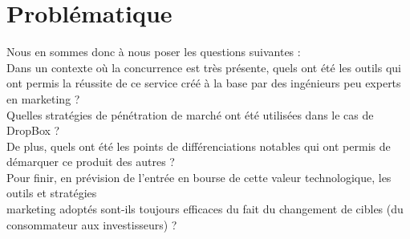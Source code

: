 \documentclass[a4paper, 10pt]{article}
\begin{document}
\section*{Probl\'ematique}
Nous en sommes donc \`a nous poser les questions suivantes :\\
Dans un contexte o\`u la concurrence est tr\`es pr\'esente, quels ont \'et\'e les outils qui ont permis la r\'eussite de ce service
cr\'e\'e \`a la base par des ing\'enieurs peu experts en marketing ?\\
Quelles strat\'egies de p\'en\'etration de march\'e ont \'et\'e utilis\'ees dans le cas de DropBox ?\\
De plus, quels ont \'et\'e les points de diff\'erenciations notables qui ont permis de d\'emarquer ce produit des autres ?\\
Pour finir, en pr\'evision de l'entr\'ee en bourse de cette valeur technologique,
les outils et strat\'egies\\marketing adopt\'es sont-ils toujours efficaces du fait du changement de cibles
(du consommateur aux investisseurs) ?
\end{document}
